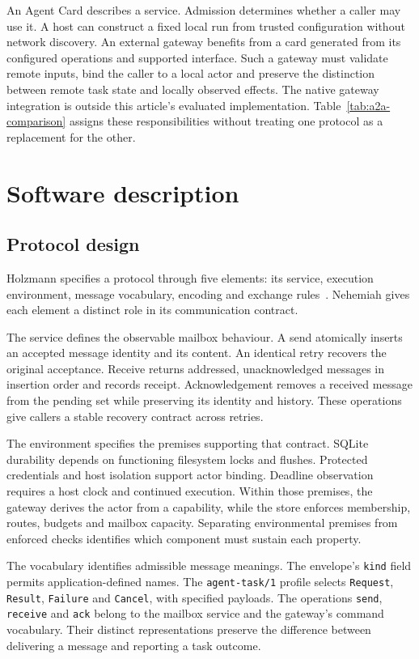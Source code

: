 \documentclass[preprint,12pt,a4paper]{elsarticle}
\newcommand{\code}[1]{\texttt{#1}}
\begin{document}
An Agent Card describes a service. Admission determines whether a caller may use it. A host can construct a fixed local run from trusted configuration without network discovery. An external gateway benefits from a card generated from its configured operations and supported interface. Such a gateway must validate remote inputs, bind the caller to a local actor and preserve the distinction between remote task state and locally observed effects. The native gateway integration is outside this article's evaluated implementation. Table~\ref{tab:a2a-comparison} assigns these responsibilities without treating one protocol as a replacement for the other.

\section{Software description}
\subsection{Protocol design}
Holzmann specifies a protocol through five elements: its service, execution environment, message vocabulary, encoding and exchange rules~\citep[Section~2.2, p.~21]{holzmann1991}. Nehemiah gives each element a distinct role in its communication contract.

The service defines the observable mailbox behaviour. A send atomically inserts an accepted message identity and its content. An identical retry recovers the original acceptance. Receive returns addressed, unacknowledged messages in insertion order and records receipt. Acknowledgement removes a received message from the pending set while preserving its identity and history. These operations give callers a stable recovery contract across retries.

The environment specifies the premises supporting that contract. SQLite durability depends on functioning filesystem locks and flushes. Protected credentials and host isolation support actor binding. Deadline observation requires a host clock and continued execution. Within those premises, the gateway derives the actor from a capability, while the store enforces membership, routes, budgets and mailbox capacity. Separating environmental premises from enforced checks identifies which component must sustain each property.

The vocabulary identifies admissible message meanings. The envelope's \code{kind} field permits application-defined names. The \code{agent-task/1} profile selects \code{Request}, \code{Result}, \code{Failure} and \code{Cancel}, with specified payloads. The operations \code{send}, \code{receive} and \code{ack} belong to the mailbox service and the gateway's command vocabulary. Their distinct representations preserve the difference between delivering a message and reporting a task outcome.
\end{document}
